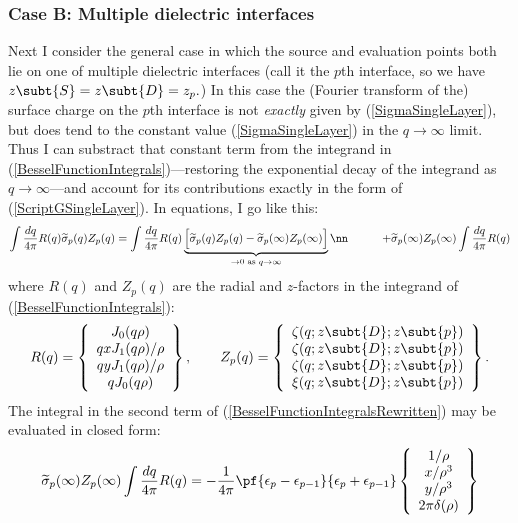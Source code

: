 \documentclass[letterpaper]{article}
\renewcommand{\wt}{\widetilde}
\begin{document}
\subsubsection*{Case B: Multiple dielectric interfaces}

Next I consider the general case in which the source and evaluation points
both lie on one of multiple dielectric interfaces
(call it the $p$th interface, so we have $z\subt{S}=z\subt{D}=z_p.$)
In this case the (Fourier transform of the) surface charge on the $p$th
interface is not \textit{exactly} given by (\ref{SigmaSingleLayer}), but
does tend to the constant value (\ref{SigmaSingleLayer}) in the 
$q\to\infty$ limit. Thus I can substract that constant term from
the integrand in (\ref{BesselFunctionIntegrals})---restoring
the exponential decay of the integrand as $q\to \infty$---and
account for its contributions exactly in the form of 
(\ref{ScriptGSingleLayer}). In equations, I go like this:
\begin{align}
 \int \frac{dq}{4\pi} R(q)
 \wt\sigma_p(q) Z_p(q)
&= 
 \int \frac{dq}{4\pi} R(q)
 \underbrace{
 \Big[\wt \sigma_p(q)Z_p(q) - \wt \sigma_p(\infty)Z_p(\infty)\Big]
            }_{\to 0 \text{ as } q\to \infty}
\nn
&\qquad + \wt\sigma_p(\infty)Z_p(\infty)
  \int \frac{dq}{4\pi} R(q)
\label{BesselFunctionIntegralsRewritten}
\end{align}
where $R(q)$ and $Z_p(q)$ are the radial and $z$-factors in
the integrand of (\ref{BesselFunctionIntegrals}):
$$R(q)=
   \left\{ 
     \begin{array}{c}
        J_0(q\rho)       \\ 
      qxJ_1(q\rho)/\rho  \\
      qyJ_1(q\rho)/\rho  \\
      qJ_0(q\rho)
     \end{array}
   \right\}, 
 \qquad 
  Z_p(q)=
   \left\{ 
     \begin{array}{c}
      \zeta(q;z\subt{D};z\subt{p}) \\
      \zeta(q;z\subt{D};z\subt{p}) \\
      \zeta(q;z\subt{D};z\subt{p}) \\
      \xi(q;z\subt{D};z\subt{p})
     \end{array}
   \right\}.
$$
The integral in the second
term of (\ref{BesselFunctionIntegralsRewritten}) may be
evaluated in closed form:
$$ \wt\sigma_p(\infty) Z_p(\infty)
   \int \frac{dq}{4\pi} R(q)
   = -\frac{1}{4\pi}
      \pf{\epsilon_p - \epsilon_{p-1}}{\epsilon_p + \epsilon_{p-1}}
      \left\{\begin{array}{c}
          1/\rho   \\
          x/\rho^3 \\
          y/\rho^3 \\
          2\pi\delta(\rho)
      \end{array}\right\}
$$
\end{document}
